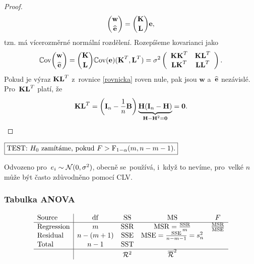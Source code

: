 \begin{proof}
 $$ \binom{\textbf{w}}{\heb} = \binom{\Km}{\Lm} \eb, $$
 tzn. má vícerozměrné normální rozdělení. Rozepíšeme kovarianci jako
  \begin{equation}\label{rovnicka}
  \Cov\binom{\textbf{w}}{\heb} = \binom{\Km}{\Lm}\Cov(\eb)(\Km^T,\Lm^T) = \sigma^2 \left(\begin{array}{cc}
  \Km\Km^T&\Km\Lm^T  \\
  \Lm\Km^T & \Lm\Lm^T
  \end{array}
  \right).
  \end{equation}
  Pokud je výraz $\Km\Lm^T$ z~rovnice \eqref{rovnicka} roven nule, pak jsou $\textbf{w}$ a~$\heb$ nezávislé.
  Pro~$\Km\Lm^T$ platí, že
 $$ \Km\Lm^T = \left(\In-\frac{1}{n}\Bm \right)\underbrace{\Hm(\In-\Hm)}_{\Hm-\Hm^2 = \nula} = \nula. $$
\end{proof}

 $\test{F>\FF_{1-\alpha}(m,n-m-1)}$

 \begin{remark}
 	Odvozeno pro~$e_i\sim\NN(0,\sigma^2)$, obecně se~používá, i~když to nevíme, pro~velké $n$ může být často zdůvodněno pomocí CLV.
 \end{remark}
\subsubsection{Tabulka ANOVA}
 $$ \begin{array}{l|cccc}
\text{Source}& \mathrm{df} & \mathrm{SS} & \mathrm{MS} & F \\\hline
\text{Regression} & m & \SSR & \MSR = \frac{\SSR}{m} & \frac{\MSR}{\MSE} \\
\text{Residual} & n-(m+1) & \SSE & \MSE = \frac{\SSE}{n-m-1} = s_n^2 &  \\
\text{Total} & n-1 & \SST &  &  \\\hline
&  & \RR^2 & \overline{\RR}^2 &
\end{array}
 $$

